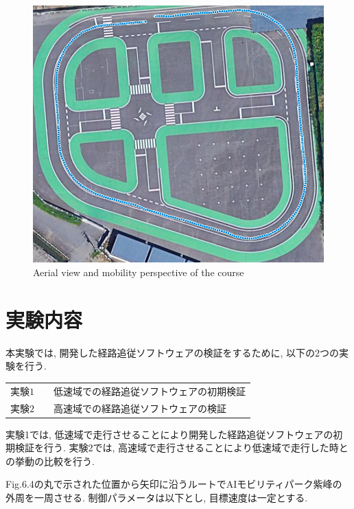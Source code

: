 \begin{figure}[H]
  \centering
 \includegraphics[keepaspectratio, scale=0.4]
      {images/targetpath.png}
 \caption{Aerial view and mobility perspective of the course}
 \label{fig:course}
\end{figure}

\section{実験内容}
本実験では, 開発した経路追従ソフトウェアの検証をするために, 以下の2つの実験を行う.
\begin{table}[H]
     \centering
     \begin{tabular}{lcl}
         $実験1$ &  & 低速域での経路追従ソフトウェアの初期検証 \\
         $実験2$ &  & 高速域での経路追従ソフトウェアの検証 \\
     \end{tabular}
\end{table}
実験1では, 低速域で走行させることにより開発した経路追従ソフトウェアの初期検証を行う.
実験2では, 高速域で走行させることにより低速域で走行した時との挙動の比較を行う.

Fig.6.4の丸で示された位置から矢印に沿うルートでAIモビリティパーク紫峰の外周を一周させる.
制御パラメータは以下とし, 目標速度は一定とする.

